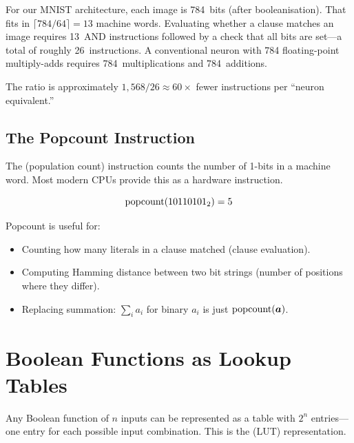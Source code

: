 \begin{engineernote}
For our MNIST architecture, each image is 784~bits (after
booleanisation). That fits in $\lceil 784 / 64 \rceil = 13$ machine
words. Evaluating whether a clause matches an image requires 13~AND
instructions followed by a check that all bits are set---a total of
roughly 26~instructions. A conventional neuron with 784 floating-point
multiply-adds requires 784~multiplications and 784~additions.

The ratio is approximately $1{,}568 / 26 \approx 60\times$ fewer
instructions per ``neuron equivalent.''
\end{engineernote}

\subsection{The Popcount Instruction}

The  (population count) instruction counts the
number of 1-bits in a machine word. Most modern CPUs provide this as
a hardware instruction.

\begin{equation}
  \operatorname{popcount}(10110101_2) = 5
  \label{eq:popcount-example}
\end{equation}

Popcount is useful for:
\begin{itemize}
  \item Counting how many literals in a clause matched (clause
    evaluation).
  \item Computing Hamming distance between two bit strings (number
    of positions where they differ).
  \item Replacing summation: $\sum_i a_i$ for binary $a_i$ is just
    $\operatorname{popcount}(\bm{a})$.
\end{itemize}


\section{Boolean Functions as Lookup Tables}
\label{sec:bool-lut}

Any Boolean function of $n$ inputs can be represented as a table with
$2^n$ entries---one entry for each possible input combination. This is
the  (LUT) representation.

